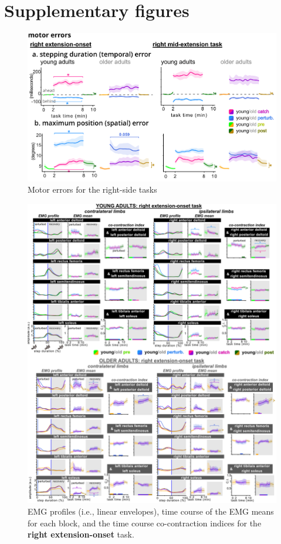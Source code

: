 \documentclass[../thesis_seyed.tex]{subfiles}
\begin{document}
\section{Supplementary figures}
\begin{figure}[H]
    \centering
    \includegraphics[scale=1]{../img/S1_error-metrics.jpg}
    \caption{Motor errors for the right-side tasks}
    \label{fig:S1}
\end{figure}
\newpage
\begin{figure}[H]
    \centering
    \includegraphics[scale=.9]{../img/S2_REI-EMG-CoCont.jpg}
    \caption{EMG profiles (i.e., linear envelopes), time course of the EMG means for each block, and the time course co-contraction indices for the \textbf{right extension-onset} task.}
    \label{fig:S2}
\end{figure}
\end{document}
